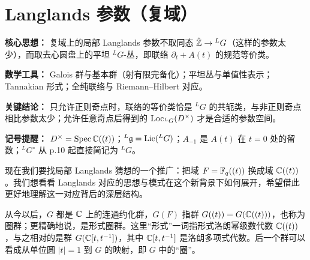 

\section{Langlands 参数（复域）}

\begin{keypoints}
    \item \textbf{核心思想：} 复域上的局部 Langlands 参数不取同态 $\hat{\mathbb{Z}}\to{}^L G$（这样的参数太少），而取去心圆盘上的平坦 ${}^L G$-丛，即联络 $\partial_t+A(t)$ 的规范等价类。
    \item \textbf{数学工具：} Galois 群与基本群（射有限完备化）；平坦丛与单值性表示；Tannakian 形式；全纯联络与 Riemann--Hilbert 对应。
    \item \textbf{关键结论：} 只允许正则奇点时，联络的等价类恰是 ${}^L G$ 的共轭类，与非正则奇点相比参数太少；允许任意奇点后得到的 $\operatorname{Loc}_{{}^L G}(D^\times)$ 才是合适的参数空间。
    \item \textbf{记号提醒：} $D^\times=\operatorname{Spec}\mathbb{C}((t))$；${}^L\mathfrak{g}=\operatorname{Lie}({}^L G)$；$A_{-1}$ 是 $A(t)$ 在 $t=0$ 处的留数；${}^L G^\circ$ 从 p.10 起直接简记为 ${}^L G$。
\end{keypoints}

现在我们要找局部 Langlands 猜想的一个推广：把域 $F=\mathbb{F}_q((t))$ 换成域 $\mathbb{C}((t))$。我们想看看 Langlands 对应的思想与模式在这个新背景下如何展开，希望借此更好地理解这一对应背后的深层结构。

从今以后，$G$ 都是 $\mathbb{C}$ 上的连通约化群，$G(F)$ 指群 $G((t))=G(\mathbb{C}((t)))$，也称为圈群；更精确地说，是形式圈群。这里“形式”一词指形式洛朗幂级数代数 $\mathbb{C}((t))$，与之相对的是群 $G(\mathbb{C}[t,t^{-1}])$，其中 $\mathbb{C}[t,t^{-1}]$ 是洛朗多项式代数。后一个群可以看成从单位圆 $|t|=1$ 到 $G$ 的映射，即 $G$ 中的“圈”。

